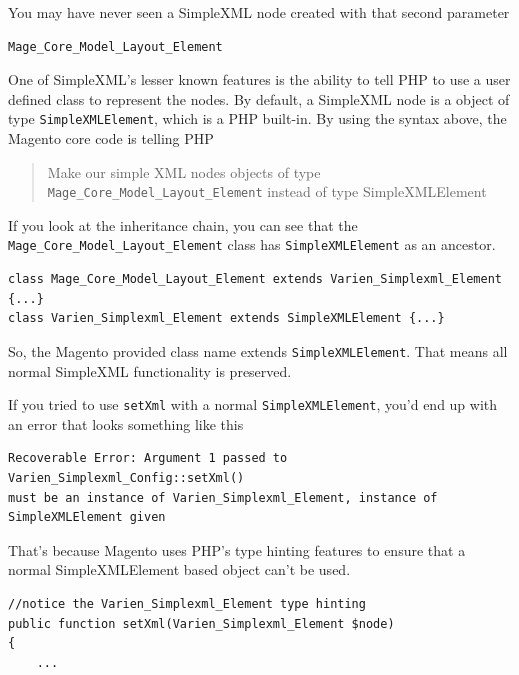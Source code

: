 \documentclass[oneside]{book}
\begin{document}
You may have never seen a SimpleXML node created with that second parameter

\begin{lstlisting}
Mage_Core_Model_Layout_Element

\end{lstlisting}


One of SimpleXML's lesser known features is the ability to tell PHP to use a user defined class to represent the nodes.  By default, a SimpleXML node is a object of type \footnotesize\texttt{SimpleXMLElement}\normalsize, which is a PHP built-in.  By using the syntax above, the Magento core code is telling PHP

\begin{quote}
Make our simple XML nodes objects of type \footnotesize\texttt{Mage\_Core\_Model\_Layout\_Element} \normalsize  instead of type SimpleXMLElement
\end{quote}

If you look at the inheritance chain, you can see that the \footnotesize\texttt{Mage\_Core\_Model\_Layout\_Element} \normalsize  class has \footnotesize\texttt{SimpleXMLElement} \normalsize  as an ancestor.

\begin{lstlisting}
class Mage_Core_Model_Layout_Element extends Varien_Simplexml_Element {...}
class Varien_Simplexml_Element extends SimpleXMLElement {...}

\end{lstlisting}


So, the Magento provided class name extends \footnotesize\texttt{SimpleXMLElement}\normalsize. That means all normal SimpleXML functionality is preserved.

If you tried to use \footnotesize\texttt{setXml} \normalsize  with a normal \footnotesize\texttt{SimpleXMLElement}\normalsize, you'd end up with an error that looks something like this

\begin{lstlisting}
Recoverable Error: Argument 1 passed to Varien_Simplexml_Config::setXml() 
must be an instance of Varien_Simplexml_Element, instance of
SimpleXMLElement given

\end{lstlisting}


That's because Magento uses PHP's type hinting features to ensure that a normal SimpleXMLElement based object can't be used.  

\begin{lstlisting}
//notice the Varien_Simplexml_Element type hinting
public function setXml(Varien_Simplexml_Element $node)
{
    ...

\end{lstlisting}
\end{document}
